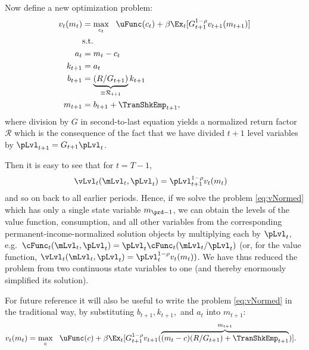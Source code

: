 Now define a new optimization problem:
  \begin{equation}\begin{gathered}\begin{aligned}
        v_{t}(m_{t}) & = \max_{{c}_{t}} ~~ \uFunc(c_{t})+{\beta}\Ex_{t}[ G_{t+1}^{1-\rho}v_{t+1}(m_{t+1})] \label{eq:vNormed}                   \\
                                         & \text{s.t.}                                                                                 \\
        a_{t}                       & = m_{t}-c_{t}                                                                     \\
        k_{t+1}                     & = a_{t}                                                                                \\
        b_{t+1}                     & = \underbrace{\left(R/G_{t+1}\right)}_{\equiv \mathcal{R}_{t+1}}k_{t+1} \\
        m_{t+1}                        & = b_{t+1}+\TranShkEmp_{t+1},
      \end{aligned}\end{gathered}\end{equation}
where division by $G$ in second-to-last equation yields a normalized return factor $\mathcal{R}$ which is the consequence of the fact that we have divided $t+1$ level variables by $\pLvl_{t+1}=G_{t+1}\pLvl_{t}$.

Then it is easy to see that for $t=T-1$, 
\begin{equation*}\begin{gathered}\begin{aligned}
      \vLvl_{t}(\mLvl_{t},\pLvl_{t}) & =  \pLvl_{t+1}^{1-\rho}v_{t}(m_{t})
    \end{aligned}\end{gathered}\end{equation*}
and so on back to all earlier periods.  Hence, if we solve the problem \eqref{eq:vNormed} which has only a single state variable $m_{\prd-1}$, we can obtain the levels of the value function, consumption, and all other variables from the corresponding permanent-income-normalized solution objects by multiplying each by $\pLvl_{t}$, e.g.\ $\cFunc_{t}(\mLvl_{t},\pLvl_{t})=\pLvl_{t}\cFunc_{t}(\mLvl_{t}/\pLvl_{t})$ (or, for the value function, $\vLvl _{t}(\mLvl_{t},\pLvl_{t}) = \pLvl_{t}^{1-\rho}v_{t}(m_{t}))$.  We have thus reduced the problem from two continuous state variables to one (and thereby enormously simplified its solution).

For future reference it will also be useful to write the problem \eqref{eq:vNormed} in the traditional way, by substituting $b_{t+1},k_{t+1},$ and $a_{t}$ into $m_{t+1}$:
\begin{equation}\begin{gathered}\begin{aligned}
      v_{t}(m_{t}) & = \max_{c} ~~ \uFunc(c)+ \beta \Ex_{t}[ G_{t+1}^{1-\rho}v_{t+1}(\overbrace{(m_{t}-c)(R/G_{t+1})+\TranShkEmp_{t+1}}^{m_{t+1}})] \label{eq:vusual}.
    \end{aligned}\end{gathered}\end{equation}

